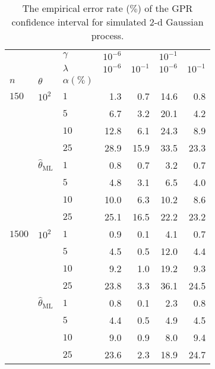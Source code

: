 \documentclass[a4paper,14pt]{extarticle}
\begin{document}
\begin{table}
\centering
  \caption{The empirical error rate ($\%$) of the GPR confidence interval for simulated
  $2$-d Gaussian process.}
  \label{tab:gaussian_2d_cov_gpr}
  \begin{tabular}{lll||rr|rr}
  \toprule
       &      & $\gamma$ & $10^{-6}$ &          & $10^{-1}$ &          \\\cline{3-3}
       &      & $\lambda$ & $10^{-6}$ & $10^{-1}$ & $10^{-6}$ & $10^{-1}$ \\\cline{3-3}
  $n$ & $\theta$ & $\alpha(\%)$ &          &          &          &          \\
  \midrule
  $150$  & $10^2$ & $1$ &     1.3 &     0.7 &    14.6 &     0.8 \\
       &      & $5$ &     6.7 &     3.2 &    20.1 &     4.2 \\
       &      & $10$ &    12.8 &     6.1 &    24.3 &     8.9 \\
       &      & $25$ &    28.9 &    15.9 &    33.5 &    23.3 \\\cline{2-7}
       & $\hat{\theta}_\text{ML}$ & $1$ &     0.8 &     0.7 &     3.2 &     0.7 \\
       &      & $5$ &     4.8 &     3.1 &     6.5 &     4.0 \\
       &      & $10$ &    10.0 &     6.3 &    10.2 &     8.6 \\
       &      & $25$ &    25.1 &    16.5 &    22.2 &    23.2 \\
  \midrule
  $1500$ & $10^2$ & $1$ &     0.9 &     0.1 &     4.1 &     0.7 \\
       &      & $5$ &     4.5 &     0.5 &    12.0 &     4.4 \\
       &      & $10$ &     9.2 &     1.0 &    19.2 &     9.3 \\
       &      & $25$ &    23.8 &     3.3 &    36.1 &    24.5 \\\cline{2-7}
       & $\hat{\theta}_\text{ML}$ & $1$ &     0.8 &     0.1 &     2.3 &     0.8 \\
       &      & $5$ &     4.4 &     0.5 &     4.9 &     4.5 \\
       &      & $10$ &     9.0 &     0.9 &     8.0 &     9.4 \\
       &      & $25$ &    23.6 &     2.3 &    18.9 &    24.7 \\
  \bottomrule
  \end{tabular}
\end{table}
\end{document}
